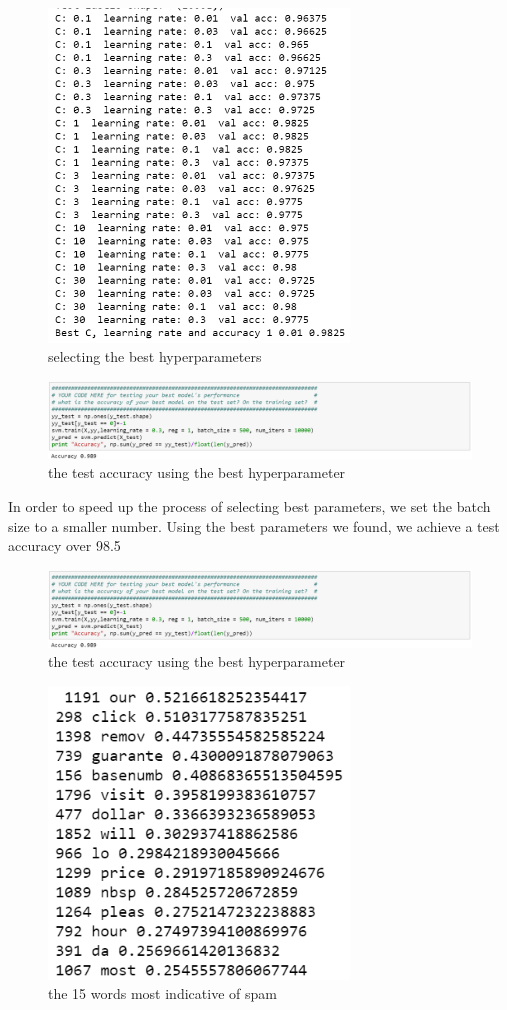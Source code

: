 \documentclass[]{book}
\theoremstyle{definition}
\begin{document}
\begin{figure}[H]
	\centering
	\includegraphics[width=8cm]{xuan.png}
	\caption{selecting the best hyperparameters}
	\label{fig:8}
\end{figure}
\begin{figure}[H]
	\centering
	\includegraphics[width=12cm]{test.png}
	\caption{the test accuracy using the best hyperparameter}
	\label{fig:9}
\end{figure}
In order to speed up the process of selecting best parameters, we set the batch size to a smaller number. Using the best parameters we found, we achieve a test accuracy over 98.5%
\begin{figure}[H]
	\centering
	\includegraphics[width=12cm]{test.png}
	\caption{the test accuracy using the best hyperparameter}
	\label{fig:10}
\end{figure}
\begin{figure}[H]
	\centering
	\includegraphics[width=8cm]{spam.png}
	\caption{the 15 words most indicative of spam}
	\label{fig:11}
\end{figure}
\end{document}
